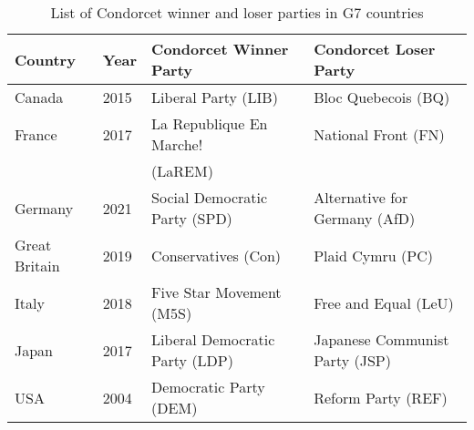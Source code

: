 \begin{table}
	\footnotesize{
\begin{tabular}{llll} \toprule 
Country & Year & Condorcet Winner Party & Condorcet Loser Party \\ \midrule 
Canada & 2015 & Liberal Party (LIB) & Bloc Quebecois (BQ) \\ \midrule
France & 2017 & La Republique En Marche!  & National Front (FN)  \\ 
& & (LaREM) & \\ \midrule 
Germany & 2021 & Social Democratic Party (SPD) & Alternative for Germany (AfD)\\  \midrule 
Great Britain & 2019 & Conservatives (Con) & Plaid Cymru (PC) \\ 	\midrule
Italy & 2018 & Five Star Movement  (M5S) & Free and Equal (LeU) \\ \midrule 
Japan & 2017 & Liberal Democratic Party (LDP) & Japanese Communist Party (JSP) \\ \midrule
USA & 2004 & Democratic Party (DEM) & Reform Party (REF) \\  \bottomrule
\end{tabular}	}
\caption{List of Condorcet winner and loser parties in G7 countries}
\label{tab.g7}
\end{table}